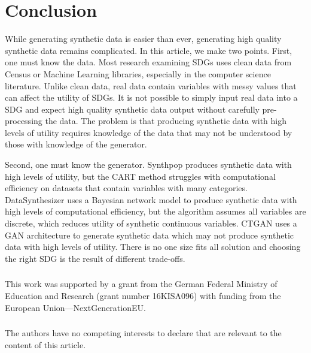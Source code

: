 \documentclass[runningheads]{llncs}
\begin{document}
\section{Conclusion}\label{sec:conclusion}

While generating synthetic data is easier than ever, generating high quality synthetic data remains complicated.  In this article, we make two points.  First, one must know the data.  Most research examining SDGs uses clean data from Census or Machine Learning libraries, especially in the computer science literature.  Unlike clean data, real data contain variables with messy values that can affect the utility of SDGs.  It is not possible to simply input real data into a SDG and expect high quality synthetic data output without carefully pre-processing the data.  The problem is that producing synthetic data with high levels of utility requires knowledge of the data that may not be understood by those with knowledge of the generator.

Second, one must know the generator.  Synthpop produces synthetic data with high levels of utility, but the CART method struggles with computational efficiency on datasets that contain variables with many categories.  DataSynthesizer uses a Bayesian network model to produce synthetic data with high levels of computational efficiency, but the algorithm assumes all variables are discrete, which reduces utility of synthetic continuous variables.  CTGAN uses a GAN architecture to generate synthetic data which may not produce synthetic data with high levels of utility.  There is no one size fits all solution and choosing the right SDG is the result of different trade-offs.  

\begin{credits}
\subsubsection{\ackname} This work was supported by a grant from the German Federal Ministry of Education and Research (grant number 16KISA096) with funding from the European Union—NextGenerationEU.

\subsubsection{\discintname}
The authors have no competing interests to declare that are
relevant to the content of this article.
\end{credits}


\end{document}
